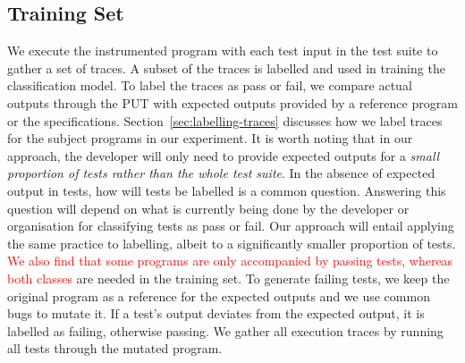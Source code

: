 \subsection{Training Set}
\label{sec:labelled-traces}
We execute the instrumented program with each test input in the test suite to gather a set of traces. A subset of the traces is labelled and used in training the classification model. To label the traces as pass or fail, we compare actual outputs through the PUT with expected outputs provided by a reference program or the specifications. %
Section~\ref{sec:labelling-traces} discusses how we label traces for the subject programs in our experiment. 
It is worth noting that in our approach, the developer will only need to provide expected outputs for a \emph{small proportion of tests rather than the whole test suite}. %
In the absence of expected output in tests, how will tests be labelled is a common question. Answering this question will depend on what is currently being done by the developer or organisation for classifying tests as pass or fail. Our approach will entail applying the same practice to labelling, albeit to a significantly smaller proportion of tests.    %
%
\iffalse
\textcolor{red}{We also find that some programs are only accompanied by passing tests, whereas both classes} are needed in the training set.
To generate failing tests, we keep the original program as a reference for the expected outputs and we use common bugs to mutate it. If a test's output deviates from the expected output, it is labelled as failing, otherwise passing. We gather all execution traces by running all tests through the mutated program.
